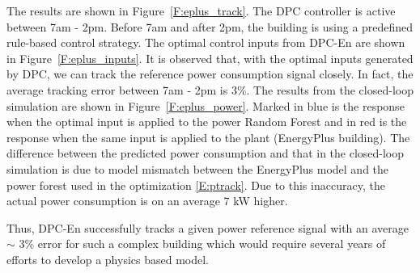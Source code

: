 The results are shown in Figure~\ref{F:eplus_track}. 
The DPC controller is active between 7am - 2pm. Before 7am and after 2pm, the building is using a predefined rule-based control strategy.
The optimal control inputs from DPC-En are shown in Figure~\ref{F:eplus_inputs}. It is observed that, with the optimal inputs generated by DPC, we can track the reference power consumption signal closely. In fact, the average tracking error between 7am - 2pm is 3\%.
\textcolor[rgb]{0,0,1}{The results from the closed-loop simulation are shown in Figure~\ref{F:eplus_power}.
Marked in blue is the response when the optimal input is applied to the power Random Forest and in red is the response when the same input is applied to the plant (EnergyPlus building).
The difference between the predicted power consumption and that in the closed-loop simulation is due to model mismatch between the EnergyPlus model and the power forest used in the optimization \eqref{E:ptrack}.} 
Due to this inaccuracy, the actual power consumption is on an average 7 kW higher.

Thus, DPC-En successfully tracks a given power reference signal with an average $\sim$ 3\% error for such a complex building which would require several years of efforts to develop a physics based model.

